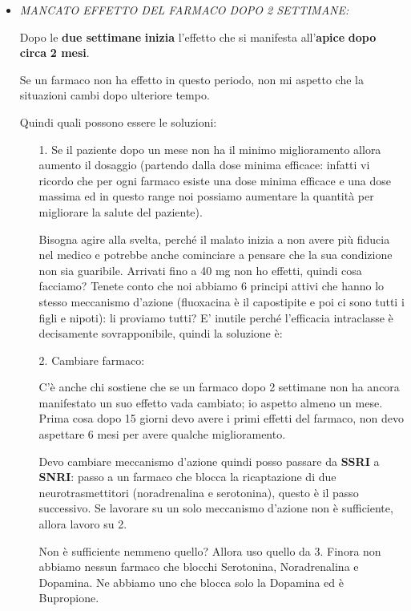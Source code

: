 \begin{itemize}
\item
  \emph{MANCATO EFFETTO DEL FARMACO DOPO 2 SETTIMANE:}

Dopo le \textbf{due settimane} \textbf{inizia} l'effetto che si
manifesta all'\textbf{apice} \textbf{dopo circa} \textbf{2 mesi}.

Se un farmaco non ha effetto in questo periodo, non mi aspetto che la
situazioni cambi dopo ulteriore tempo.

Quindi quali possono essere le soluzioni:

\begin{itemize}
\item[1.]
  Se il paziente dopo un mese non ha il minimo miglioramento allora
  aumento il dosaggio (partendo dalla dose minima efficace: infatti vi
  ricordo che per ogni farmaco esiste una dose minima efficace e una
  dose massima ed in questo range noi possiamo aumentare la quantità per
  migliorare la salute del paziente).

Bisogna agire alla svelta, perché il malato inizia a non avere più
fiducia nel medico e potrebbe anche cominciare a pensare che la sua
condizione non sia guaribile. Arrivati fino a 40 mg non ho effetti,
quindi cosa facciamo? Tenete conto che noi abbiamo 6 principi attivi che
hanno lo stesso meccanismo d'azione (fluoxacina è il capostipite e poi
ci sono tutti i figli e nipoti): li proviamo tutti? E' inutile perché
l'efficacia intraclasse è decisamente sovrapponibile, quindi la
soluzione è:

\item[2.]
  Cambiare farmaco:

C'è anche chi sostiene che se un farmaco dopo 2 settimane non ha ancora
manifestato un suo effetto vada cambiato; io aspetto almeno un mese.
Prima cosa dopo 15 giorni devo avere i primi effetti del farmaco, non
devo aspettare 6 mesi per avere qualche miglioramento.

Devo cambiare meccanismo d'azione quindi posso passare da \textbf{SSRI}
a \textbf{SNRI}: passo a un farmaco che blocca la ricaptazione di due
neurotrasmettitori (noradrenalina e serotonina), questo è il passo
successivo. Se lavorare su un solo meccanismo d'azione non è
sufficiente, allora lavoro su 2.

Non è sufficiente nemmeno quello? Allora uso quello da 3. Finora non
abbiamo nessun farmaco che blocchi Serotonina, Noradrenalina e Dopamina.
Ne abbiamo uno che blocca solo la Dopamina ed è Bupropione.


\end{itemize}
\end{itemize}
